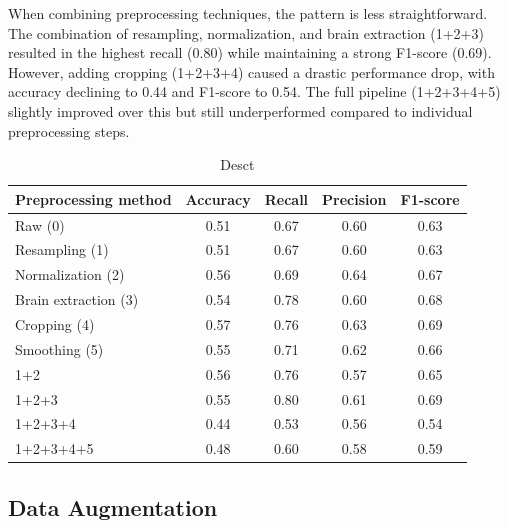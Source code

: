 When combining preprocessing techniques, the pattern is less straightforward. The combination of resampling, normalization, and brain extraction (1+2+3) resulted in the highest recall (0.80) while maintaining a strong F1-score (0.69). However, adding cropping (1+2+3+4) caused a drastic performance drop, with accuracy declining to 0.44 and F1-score to 0.54. The full pipeline (1+2+3+4+5) slightly improved over this but still underperformed compared to individual preprocessing steps.
\begin{center}
	\begin{table}[t]
		\centering
		\caption{\label{tab:model_metrics_preprocessing}Desct}
		\begin{tabular*}{500pt}{@{\extracolsep\fill}lcccc@{\extracolsep\fill}}
			\toprule
		     \textbf{Preprocessing method} &\textbf{Accuracy} &  \textbf{Recall} &\textbf{Precision} &\textbf{F1-score}\\
			\midrule
			Raw (0) & 0.51 & 0.67 & 0.60 & 0.63 \\
			Resampling (1) & 0.51 & 0.67 & 0.60 & 0.63 \\
			Normalization (2) & 0.56 & 0.69 & 0.64 & 0.67 \\
			Brain extraction (3) & 0.54 & 0.78 & 0.60 & 0.68 \\
			Cropping (4) & 0.57 & 0.76 & 0.63 & 0.69 \\
			Smoothing (5) & 0.55 & 0.71 & 0.62 & 0.66 \\
            1+2 & 0.56 & 0.76 & 0.57 & 0.65 \\
            1+2+3 & 0.55 & 0.80 & 0.61 & 0.69 \\
            1+2+3+4 & 0.44 & 0.53 & 0.56 & 0.54 \\
            1+2+3+4+5 & 0.48 & 0.60 & 0.58 & 0.59 \\
			\bottomrule
		\end{tabular*}
	\end{table}
\end{center}

\subsection{Data Augmentation}

